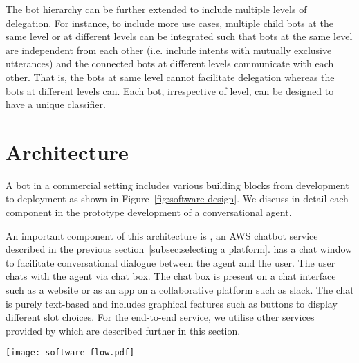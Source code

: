 \documentclass[runningheads]{llncs}
\begin{document}
The bot hierarchy can be further extended to include multiple levels of delegation. For instance, to include more use cases, multiple child bots at the same level or at different levels can be integrated such that bots at the same level are independent from each other (i.e. include intents with mutually exclusive utterances) and the connected bots at different levels communicate with each other. That is, the bots at same level cannot facilitate delegation whereas the bots at different levels can. Each bot, irrespective of level, can be designed to have a unique classifier.


\section{Architecture}\label{sec:architecture}
A bot in a commercial setting includes various building blocks from development to deployment as shown in Figure~\ref{fig:software design}. We discuss in detail each component in the prototype development of a conversational agent. 

An important component of this architecture is \lex, an AWS chatbot service described in the previous section~\ref{subsec:selecting a platform}. \lex has a chat window to facilitate conversational dialogue between the agent and the user. The user chats with the agent via chat box. The chat box is present on a chat interface such as a website or as an app on a collaborative platform such as slack. The chat is purely text-based and includes graphical features such as buttons to display different slot choices. For the end-to-end service, we utilise other services provided by \aws which are described further in this section.
%
\begin{figure*}
    \centering
    \texttt{[image: software\_flow.pdf]}
    \caption{Software architecture}
    \label{fig:software design}
\end{figure*}
\end{document}
